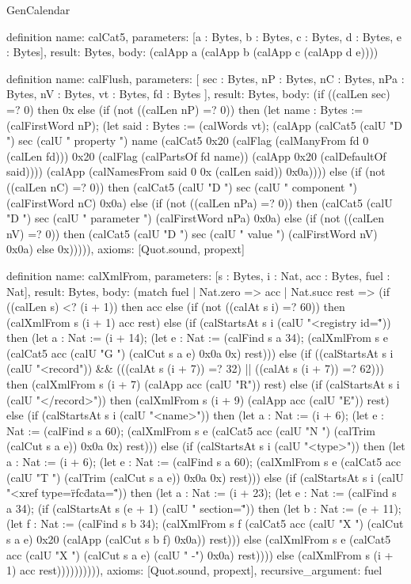 \begin{lexlean}{GenCalendar}
\begin{semanticmodule}
definition{
  name: calCat5,
  parameters: [a : Bytes, b : Bytes, c : Bytes, d : Bytes, e : Bytes],
  result: Bytes,
  body: (calApp a (calApp b (calApp c (calApp d e))))
}

definition{
  name: calFlush,
  parameters: [
    sec : Bytes,
    nP : Bytes,
    nC : Bytes,
    nPa : Bytes,
    nV : Bytes,
    vt : Bytes,
    fd : Bytes
  ],
  result: Bytes,
  body: (if ((calLen sec) =? 0) then 0x else (if (not ((calLen nP) =? 0)) then (let name : Bytes := (calFirstWord nP); (let said : Bytes := (calWords vt); (calApp (calCat5 (calU "D ") sec (calU " property ") name (calCat5 0x20 (calFlag (calManyFrom fd 0 (calLen fd))) 0x20 (calFlag (calPartsOf fd name)) (calApp 0x20 (calDefaultOf said)))) (calApp (calNamesFrom said 0 0x (calLen said)) 0x0a)))) else (if (not ((calLen nC) =? 0)) then (calCat5 (calU "D ") sec (calU " component ") (calFirstWord nC) 0x0a) else (if (not ((calLen nPa) =? 0)) then (calCat5 (calU "D ") sec (calU " parameter ") (calFirstWord nPa) 0x0a) else (if (not ((calLen nV) =? 0)) then (calCat5 (calU "D ") sec (calU " value ") (calFirstWord nV) 0x0a) else 0x))))),
  axioms: [Quot.sound, propext]
}

definition{
  name: calXmlFrom,
  parameters: [s : Bytes, i : Nat, acc : Bytes, fuel : Nat],
  result: Bytes,
  body: (match fuel
    | Nat.zero => acc
    | Nat.succ rest => (if ((calLen s) <? (i + 1)) then acc else (if (not ((calAt s i) =? 60)) then (calXmlFrom s (i + 1) acc rest) else (if (calStartsAt s i (calU "<registry id=\"")) then (let a : Nat := (i + 14); (let e : Nat := (calFind s a 34); (calXmlFrom s e (calCat5 acc (calU "G ") (calCut s a e) 0x0a 0x) rest))) else (if ((calStartsAt s i (calU "<record")) && (((calAt s (i + 7)) =? 32) || ((calAt s (i + 7)) =? 62))) then (calXmlFrom s (i + 7) (calApp acc (calU "R\n")) rest) else (if (calStartsAt s i (calU "</record>")) then (calXmlFrom s (i + 9) (calApp acc (calU "E\n")) rest) else (if (calStartsAt s i (calU "<name>")) then (let a : Nat := (i + 6); (let e : Nat := (calFind s a 60); (calXmlFrom s e (calCat5 acc (calU "N ") (calTrim (calCut s a e)) 0x0a 0x) rest))) else (if (calStartsAt s i (calU "<type>")) then (let a : Nat := (i + 6); (let e : Nat := (calFind s a 60); (calXmlFrom s e (calCat5 acc (calU "T ") (calTrim (calCut s a e)) 0x0a 0x) rest))) else (if (calStartsAt s i (calU "<xref type=\"rfc\" data=\"")) then (let a : Nat := (i + 23); (let e : Nat := (calFind s a 34); (if (calStartsAt s (e + 1) (calU " section=\"")) then (let b : Nat := (e + 11); (let f : Nat := (calFind s b 34); (calXmlFrom s f (calCat5 acc (calU "X ") (calCut s a e) 0x20 (calApp (calCut s b f) 0x0a)) rest))) else (calXmlFrom s e (calCat5 acc (calU "X ") (calCut s a e) (calU " -") 0x0a) rest)))) else (calXmlFrom s (i + 1) acc rest)))))))))),
  axioms: [Quot.sound, propext],
  recursive_argument: fuel
}


\end{semanticmodule}
\end{lexlean}
